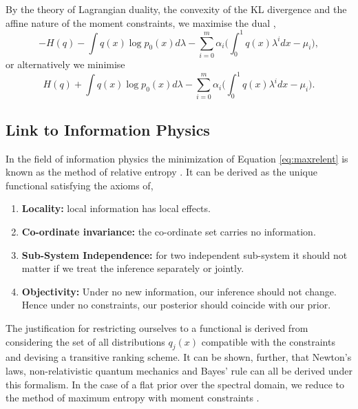 \documentclass[letterpaper]{article} %
\begin{document}
By the theory of Lagrangian duality, the convexity of the KL divergence and the affine nature of the moment constraints, we maximise the dual \cite{boyd_vandenberghe_2009},
\begin{equation}
-H(q) - \int q(x)\log p_{0}(x)d\lambda - \sum_{i=0}^{m}\alpha_{i}\biggl(\int_{0}^{1}q(x)\lambda^{i}dx - \mu_{i}\biggr),
\end{equation}
or alternatively we minimise
\begin{equation}
\label{eq:maxrelent}
H(q) + \int q(x)\log p_{0}(x)d\lambda - \sum_{i=0}^{m}\alpha_{i}\biggl(\int_{0}^{1}q(x)\lambda^{i}dx - \mu_{i}\biggr).
\end{equation}

\subsection{Link to Information Physics}
In the field of information physics the minimization of Equation \eqref{eq:maxrelent} is known as the method of relative entropy \cite{caticha2012entropic}. It can be derived as the unique functional satisfying the axioms of,
\begin{enumerate}
	\item {\bfseries Locality:} local information has local effects.
	\item {\bfseries Co-ordinate invariance:} the co-ordinate set carries no information.
	\item {\bfseries Sub-System Independence:} for two independent sub-system it should not matter if we treat the inference separately or jointly.
	\item {\bfseries Objectivity:} Under no new information, our inference should not change. Hence under no constraints, our posterior should coincide with our prior.
\end{enumerate}
The justification for restricting ourselves to a functional is derived from considering the set of all distributions $q_{j}(x)$ compatible with the constraints and devising a transitive ranking scheme.  It can be shown, further, that Newton's laws, non-relativistic quantum mechanics and Bayes' rule can all be derived under this formalism. In the case of a flat prior over the spectral domain, we reduce to the method of maximum entropy with moment constraints \cite{jaynes1982rationale,inftheoryjaynes}.  
\end{document}
